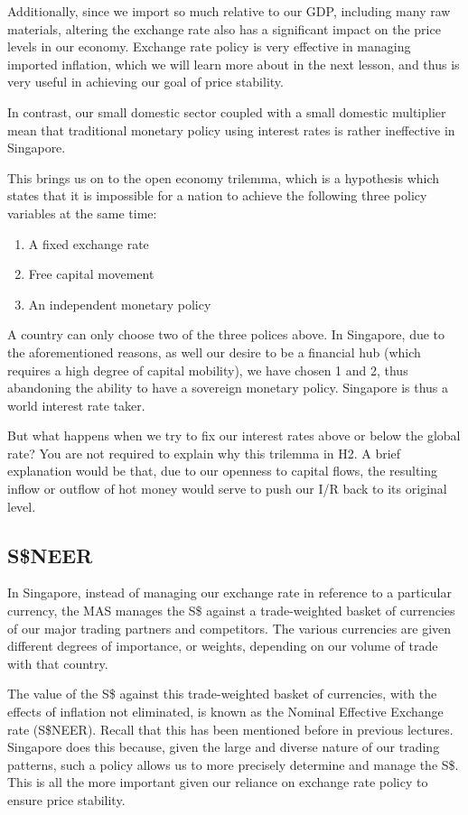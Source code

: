 Additionally, since we import so much relative to our GDP, including many raw materials, altering the exchange rate also has a significant impact on the price levels in our economy. Exchange rate policy is very effective in managing imported inflation, which we will learn more about in the next lesson, and thus is very useful in achieving our goal of price stability.

In contrast, our small domestic sector coupled with a small domestic multiplier mean that traditional monetary policy using interest rates is rather ineffective in Singapore.

This brings us on to the open economy trilemma, which is a hypothesis which states that it is impossible for a nation to achieve the following three policy variables at the same time:
\begin{enumerate}
\item A fixed exchange rate
\item Free capital movement
\item An independent monetary policy
\end{enumerate}
A country can only choose two of the three polices above. In Singapore, due to the aforementioned reasons, as well our desire to be a financial hub (which requires a high degree of capital mobility), we have chosen 1 and 2, thus abandoning the ability to have a sovereign monetary policy. Singapore is thus a world interest rate taker.

But what happens when we try to fix our interest rates above or below the global rate? You are not required to explain why this trilemma in H2. A brief explanation would be that, due to our openness to capital flows, the resulting inflow or outflow of hot money would serve to push our I/R back to its original level.
\subsection{S\$NEER}
In Singapore, instead of managing our exchange rate in reference to a particular currency, the MAS manages the S\$ against a trade-weighted basket of currencies of our major trading partners and competitors. The various currencies are given different degrees of importance, or weights, depending on our volume of trade with that country.

The value of the S\$ against this trade-weighted basket of currencies, with the effects of inflation not eliminated, is known as the Nominal Effective Exchange rate (S\$NEER). Recall that this has been mentioned before in previous lectures. Singapore does this because, given the large and diverse nature of our trading patterns, such a policy allows us to more precisely determine and manage the S\$. This is all the more important given our reliance on exchange rate policy to ensure price stability.

